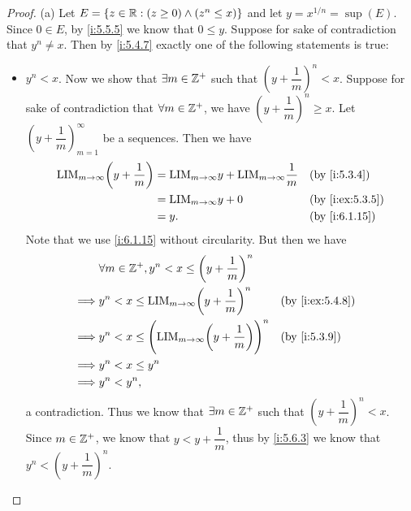 \begin{proof}{(a)}
  Let \(E = \left\lbrace z \in \mathbb{R} : (z \geq 0) \land (z^n \leq x)\right\rbrace\) and let \(y = x^{1 / n} = \sup(E)\).
  Since \(0 \in E\), by \cref{i:5.5.5} we know that \(0 \leq y\).
  Suppose for sake of contradiction that \(y^n \neq x\).
  Then by \cref{i:5.4.7} exactly one of the following statements is true:
  \begin{itemize}
    \item \(y^n < x\).
          Now we show that \(\exists m \in \mathbb{Z}^+\) such that \((y + \dfrac{1}{m})^n < x\).
          Suppose for sake of contradiction that \(\forall m \in \mathbb{Z}^+\), we have \((y + \dfrac{1}{m})^n \geq x\).
          Let \((y + \dfrac{1}{m})_{m = 1}^\infty\) be a sequences.
          Then we have
          \begin{align*}
            \text{LIM}_{m \to \infty} \bigg(y + \dfrac{1}{m}\bigg) & = \text{LIM}_{m \to \infty} y + \text{LIM}_{m \to \infty} \dfrac{1}{m} &  & \by{i:5.3.4}    \\
                                                                   & = \text{LIM}_{m \to \infty} y + 0                                      &  & \by{i:ex:5.3.5} \\
                                                                   & = y.                                                                   &  & \by{i:6.1.15}
          \end{align*}
          Note that we use \cref{i:6.1.15} without circularity.
          But then we have
          \begin{align*}
                     & \forall m \in \Z^+, y^n < x \leq \bigg(y + \dfrac{1}{m}\bigg)^n                                        \\
            \implies & y^n < x \leq \text{LIM}_{m \to \infty} \bigg(y + \dfrac{1}{m}\bigg)^n             &  & \by{i:ex:5.4.8} \\
            \implies & y^n < x \leq \Bigg(\text{LIM}_{m \to \infty} \bigg(y + \dfrac{1}{m}\bigg)\Bigg)^n &  & \by{i:5.3.9}    \\
            \implies & y^n < x \leq y^n                                                                                       \\
            \implies & y^n < y^n,
          \end{align*}
          a contradiction.
          Thus we know that \(\exists m \in \mathbb{Z}^+\) such that \((y + \dfrac{1}{m})^n < x\).
          Since \(m \in \mathbb{Z}^+\), we know that \(y < y + \dfrac{1}{m}\), thus by \cref{i:5.6.3} we know that \(y^n < (y + \dfrac{1}{m})^n\).

\end{itemize}
\end{proof}
